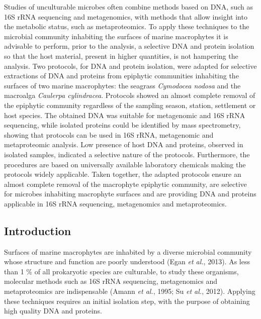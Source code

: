 \documentclass[12pt,]{article}
\begin{document}
Studies of unculturable microbes often combine methods based on DNA,
such as 16S rRNA sequencing and metagenomics, with methods that allow
insight into the metabolic status, such as metaproteomics. To apply
these techniques to the microbial community inhabiting the surfaces of
marine macrophytes it is advisable to perform, prior to the analysis, a
selective DNA and protein isolation so that the host material, present
in higher quantities, is not hampering the analysis. Two protocols, for
DNA and protein isolation, were adapted for selective extractions of DNA
and proteins from epiphytic communities inhabiting the surfaces of two
marine macrophytes: the seagrass \emph{Cymodocea nodosa} and the
macroalga \emph{Caulerpa cylindracea}. Protocols showed an almost
complete removal of the epiphytic community regardless of the sampling
season, station, settlement or host species. The obtained DNA was
suitable for metagenomic and 16S rRNA sequencing, while isolated
proteins could be identified by mass spectrometry, showing that
protocols can be used in 16S rRNA, metagenomic and metaproteomic
analysis. Low presence of host DNA and proteins, observed in isolated
samples, indicated a selective nature of the protocols. Furthermore, the
procedures are based on universally available laboratory chemicals
making the protocols widely applicable. Taken together, the adapted
protocols ensure an almost complete removal of the macrophyte epiphytic
community, are selective for microbes inhabiting macrophyte surfaces and
are providing DNA and proteins applicable in 16S rRNA sequencing,
metagenomics and metaproteomics.

\newpage

\hypertarget{introduction}{%
\subsection{Introduction}\label{introduction}}

Surfaces of marine macrophytes are inhabited by a diverse microbial
community whose structure and function are poorly understood (Egan
\emph{et al.}, 2013). As less than 1 \% of all prokaryotic species are
culturable, to study these organisms, molecular methods such as 16S rRNA
sequencing, metagenomics and metaproteomics are indispensable (Amann
\emph{et al.}, 1995; Su \emph{et al.}, 2012). Applying these techniques
requires an initial isolation step, with the purpose of obtaining high
quality DNA and proteins.
\end{document}
